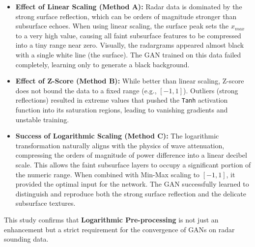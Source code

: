 \begin{itemize}
    \item \textbf{Effect of Linear Scaling (Method A):} Radar data is dominated by the strong surface reflection, which can be orders of magnitude stronger than subsurface echoes. When using linear scaling, the surface peak sets the $x_{max}$ to a very high value, causing all faint subsurface features to be compressed into a tiny range near zero. Visually, the radargrams appeared almost black with a single white line (the surface). The GAN trained on this data failed completely, learning only to generate a black background.
    
    \item \textbf{Effect of Z-Score (Method B):} While better than linear scaling, Z-score does not bound the data to a fixed range (e.g., $[-1, 1]$). Outliers (strong reflections) resulted in extreme values that pushed the \texttt{Tanh} activation function into its saturation regions, leading to vanishing gradients and unstable training.
    
    \item \textbf{Success of Logarithmic Scaling (Method C):} The logarithmic transformation naturally aligns with the physics of wave attenuation, compressing the orders of magnitude of power difference into a linear decibel scale. This allows the faint subsurface layers to occupy a significant portion of the numeric range. When combined with Min-Max scaling to $[-1, 1]$, it provided the optimal input for the network. The GAN successfully learned to distinguish and reproduce both the strong surface reflection and the delicate subsurface textures.
\end{itemize}

This study confirms that \textbf{Logarithmic Pre-processing} is not just an enhancement but a strict requirement for the convergence of GANs on radar sounding data.

